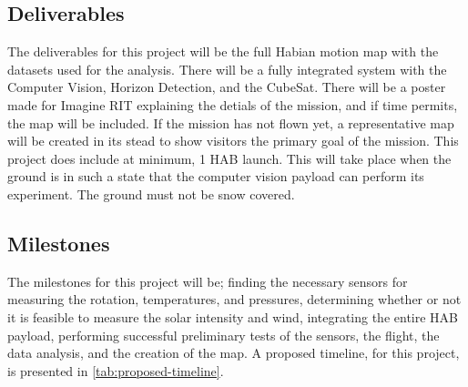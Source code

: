 \documentclass[conference]{IEEEtran} %
\begin{document}
\subsection{Deliverables}\label{subsec:deliverables}
The deliverables for this project will be the full Habian motion map with the datasets used for the analysis. There will be a fully integrated system with the Computer Vision, Horizon Detection, and the CubeSat.
There will be a poster made for Imagine RIT explaining the detials of the mission, and if time permits, the map will be included. If the mission has not flown yet, a representative map will
be created in its stead to show visitors the primary goal of the mission. This project does include at minimum, 1 HAB launch. This will take place when the ground is in such a state that the
computer vision payload can perform its experiment. The ground must not be snow covered.

\subsection{Milestones}\label{subsec:milestones}
The milestones for this project will be; finding the necessary sensors for measuring the rotation, temperatures, and pressures, determining whether or not it is feasible to measure
the solar intensity and wind, integrating the entire HAB payload, performing successful preliminary tests of the sensors, the flight, the data analysis, and the creation of the map.
A proposed timeline, for this project, is presented in \autoref{tab:proposed-timeline}.
\end{document}
